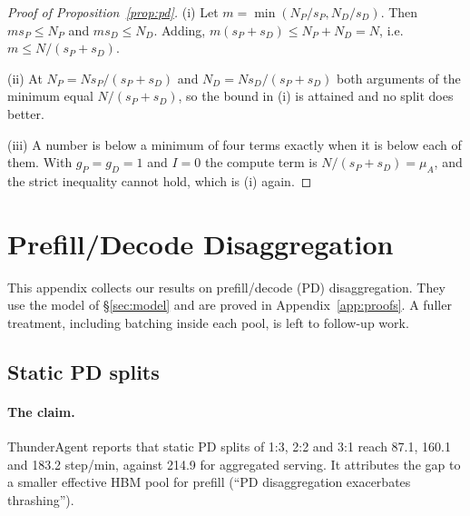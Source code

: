 
\begin{proof}[Proof of Proposition~\ref{prop:pd}]
(i) Let $m=\min(N_P/s_P,N_D/s_D)$. Then $ms_P\le N_P$ and $ms_D\le N_D$.
Adding, $m(s_P+s_D)\le N_P+N_D=N$, i.e.\ $m\le N/(s_P+s_D)$.

(ii) At $N_P=Ns_P/(s_P+s_D)$ and $N_D=Ns_D/(s_P+s_D)$ both arguments of
the minimum equal $N/(s_P+s_D)$, so the bound in (i) is attained and no
split does better.

(iii) A number is below a minimum of four terms exactly when it is below
each of them. With $g_P=g_D=1$ and $I=0$ the compute term is
$N/(s_P+s_D)=\mu_A$, and the strict inequality cannot hold, which is (i)
again.
\end{proof}


\section{Prefill/Decode Disaggregation}\label{app:pd}

This appendix collects our results on prefill/decode (PD)
disaggregation. They use the model of \S\ref{sec:model} and are proved
in Appendix~\ref{app:proofs}. A fuller treatment, including batching
inside each pool, is left to follow-up work.

\subsection{Static PD splits}\label{sec:pd}

\paragraph{The claim.} ThunderAgent \citep[App.~A.2, Fig.~7]{thunderagent}
reports that static PD splits of 1:3, 2:2 and 3:1 reach 87.1, 160.1 and
183.2 step/min, against 214.9 for aggregated serving. It attributes the
gap to a smaller effective HBM pool for prefill (``PD disaggregation
exacerbates thrashing'').


